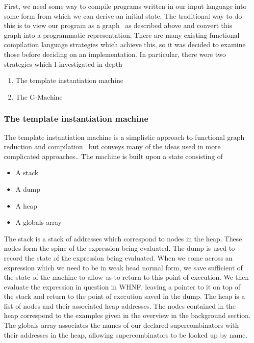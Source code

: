 First, we need some way to compile programs written in our input language into
some form from which we can derive an initial state. The traditional way to
do this is to view our program as a graph~\cite[pp.185]{SPJ} as described above and convert this
graph into a programmatic representation. There are many existing functional
compilation language strategies which achieve this, so it was decided to 
examine those before deciding on an implementation. In particular, there were
two strategies which I investigated in-depth

\begin{enumerate}
	\item The template instantiation machine
	\item The G-Machine
\end{enumerate}

\subsubsection{The template instantiation machine} 
The template instantiation machine is a simplistic approach to
functional graph reduction and compilation~\cite[pp.42]{Tutorial} but conveys many of 
the ideas used in more complicated approaches.. The machine is built 
upon a state consisting of
\begin{itemize}
	\item A stack
	\item A dump
	\item A heap
	\item A globals array
\end{itemize}

\noindent The stack is a stack of addresses which correspond
to nodes in the heap. These nodes form the spine of the 
expression being evaluated. The dump is used to record the
state of the expression being evaluated. When we come across
an expression which we need to be in weak head normal form, 
we save sufficient of the state of the machine to allow us to
return to this point of execution. We then evaluate the expression
in question in WHNF, leaving a pointer to it on top of the stack
and return to the point of execution saved in the dump.
The heap is a list of nodes and their associated heap addresses.
The nodes contained in the heap correspond to the examples
given in the overview in the background section.
The globals array associates the names of our declared
supercombinators with their addresses in the heap, allowing
supercombinators to be looked up by name. 


